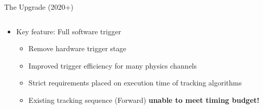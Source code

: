\documentclass[aspectratio=1610]{beamer}
\begin{document}
\begin{frame}{The \lhcb Upgrade (2020+)}
\begin{columns}
\begin{column}{0.6\textwidth}
  \begin{itemize}
    \item Key feature: Full software trigger
    \begin{itemize}
      \item[\ding{70}] Remove hardware trigger stage
      \item[\ding{70}] Improved trigger efficiency for many physics channels
      \item[\ding{80}] Strict requirements placed on execution time of tracking algorithms
      \item[\ding{80}] Existing tracking sequence (\velo \to Forward) {\bf unable to meet timing budget!}
    \end{itemize}
  \end{itemize}


\end{column}
\end{columns}
\end{frame}
\end{document}
